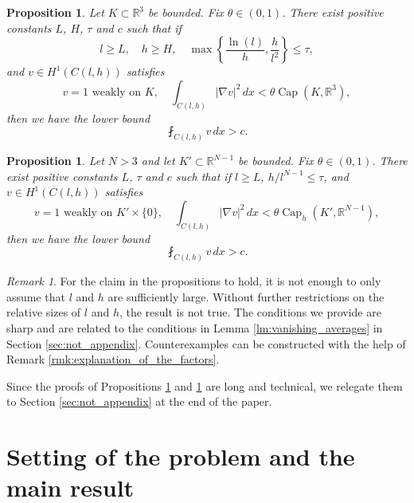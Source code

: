 \documentclass{article}
\numberwithin{equation}{section}
\newtheorem{proposition}[theorem]{Proposition}
\theoremstyle{definition}
\theoremstyle{remark}
\newtheorem{remark}{Remark}[theorem]
\newcommand{\cpct}{\operatorname{Cap}}
\begin{document}
\begin{proposition} \label{pr:subcapacitary_growth_1}
    Let $K \subset \mathbb{R}^3$ be bounded. Fix $\theta \in (0, 1)$. There exist positive constants $L$, $H$, $\tau$ and $c$ such that if
    \[
    l \ge L, \quad h \ge H, \quad \max \left\{\frac{\ln(l)}{h}, \frac{h}{l^2} \right\} \le \tau,
    \]
    and $v \in H^1(C(l, h))$ satisfies
    \[
    v = 1 \text{ weakly on } K, \quad \int_{C(l, h)} |\nabla v|^2 \, dx < \theta \cpct(K, \mathbb{R}^3),
    \]
    then we have the lower bound
    \[
    \fint_{C(l, h)} v \, dx > c.
    \]
\end{proposition}

\begin{proposition} \label{pr:subcapacitary_growth_2}
    Let $N > 3$ and let $K' \subset \mathbb{R}^{N - 1}$ be bounded. Fix $\theta \in (0, 1)$. There exist positive constants $L$, $\tau$ and $c$ such that if $l \ge L$, $h/l^{N - 1} \le \tau$, and $v \in H^1(C(l, h))$ satisfies
    \[
    v = 1 \text{ weakly on } K' \times \{0\}, \quad \int_{C(l, h)} |\nabla v|^2 \, dx < \theta \cpct_h(K', \mathbb{R}^{N - 1}),
    \]
    then we have the lower bound
    \[
    \fint_{C(l, h)} v \, dx > c.
    \]
\end{proposition}

\begin{remark}
    For the claim in the propositions to hold, it is not enough to only assume that $l$ and $h$ are sufficiently large. Without further restrictions on the relative sizes of $l$ and $h$, the result is not true. The conditions we provide are sharp and are related to the conditions in Lemma \ref{lm:vanishing_averages} in Section \ref{sec:not_appendix}. Counterexamples can be constructed with the help of Remark \ref{rmk:explanation_of_the_factors}.
\end{remark}

Since the proofs of Propositions \ref{pr:subcapacitary_growth_1} and \ref{pr:subcapacitary_growth_2} are long and technical, we relegate them to Section \ref{sec:not_appendix} at the end of the paper.

\section{Setting of the problem and the main result} \label{sec:main_result}
\end{document}
